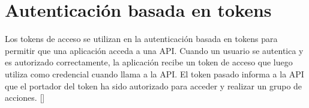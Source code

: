 %
%
%
%


\section{Autenticación basada en tokens}

Los tokens de acceso se utilizan en la autenticación basada en tokens para permitir que una aplicación acceda a una API. Cuando un usuario se autentica y es autorizado correctamente, la aplicación recibe un token de acceso que luego utiliza como credencial cuando llama a la API. El token pasado informa a la API que el portador del token ha sido autorizado para acceder y realizar un grupo de acciones. [\cite{auth0AccessTokens}]

